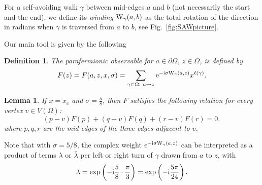 \documentclass[a4paper,oneside,12pt]{article}
\newtheorem{lemma}{Lemma}
\newtheorem{definition}{Definition}
\newcommand{\g}{\gamma}
\newcommand{\e}{{\rm e}}
\newcommand{\I}{{\rm i}}
\newcommand{\W}{{\rm W}}
\begin{document}
For a self-avoiding walk $\g$ between mid-edges $a$ and $b$ (not necessarily the start and the end), we define its
\emph{winding $\W_\g(a,b)$} as the total rotation of the direction in radians when $\g$ is traversed from $a$ to $b$, see Fig.~\ref{fig:SAWpicture}. 

Our main tool is given by the following
\begin{definition}
The \emph{parafermionic observable} for $a\in \partial \Omega$, $z\in \Omega$, 
is defined by
\begin{equation*}
	F(z)=F(a,z,x,\sigma)=\sum_{\g\subset \Omega:\ a\rightarrow z}\e^{-\I\sigma \W_\g(a,z)} x^{\ell(\g)}.
\end{equation*}
\end{definition}

\begin{lemma}\label{lem:relation}
	If $x=x_c$ and $\sigma=\frac 58$, then $F$ satisfies the following relation for every vertex $v\in V(\Omega)$:
	\begin{equation}\label{relation around vertex}
		(p-v)F(p)+(q-v)F(q)+(r-v)F(r)=0,
	\end{equation}
	where $p,q,r$ are the mid-edges of the three edges adjacent to $v$.
\end{lemma}

Note that with $\sigma=5/8$, the complex weight $\e^{-\I\sigma \W_\g(a,z)}$ 
can be interpreted as a product of terms $\lambda$ or $\bar{\lambda}$ 
per left or right turn of $\g$ drawn from $a$ to $z$, with
 $$\lambda=\exp \left(-\I \frac{5}{8}\cdot \frac{\pi}{3}\right)=
\exp \left(-\I \frac{5\pi}{24}\right).$$
\end{document}
